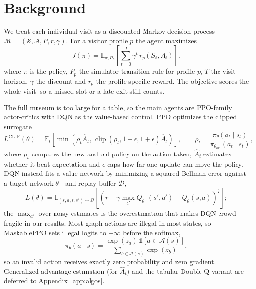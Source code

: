 \documentclass[11pt]{article}
\numberwithin{equation}{section} %
\newcommand{\E}{\mathbb{E}}
\newcommand{\Acal}{\mathcal{A}}
\newcommand{\ind}{\mathbb{1}}
\newcommand{\added}[1]{{\color{green!50!black}#1}}
\newenvironment{addedblock}{\begingroup\color{green!50!black}}{\endgroup}
\begin{document}
\added{\section{Background}}
\begin{addedblock}
We treat each individual visit as a discounted Markov decision process
$\mathcal{M}=(\mathcal{S},\mathcal{A},P,r,\gamma)$. For a visitor profile $p$ the agent maximizes
\begin{equation}
J(\pi)=\E_{\pi,P_p}\!\left[\sum_{t=0}^{T}\gamma^t\,r_p(S_t,A_t)\right],
\label{eq:objective}
\end{equation}
where $\pi$ is the policy, $P_p$ the simulator transition rule for profile $p$, $T$ the visit horizon,
$\gamma$ the discount and $r_p$ the profile-specific reward. The objective scores the whole visit, so a missed
slot or a late exit still counts.

The full museum is too large for a table, so the main agents are PPO-family actor-critics with DQN as the
value-based control. PPO \citep{schulman2017} optimizes the clipped surrogate
\begin{equation}
L^{\text{CLIP}}(\theta)=
\E_t\!\left[\min\!\left(\rho_t\hat A_t,\,
\operatorname{clip}(\rho_t,1-\epsilon,1+\epsilon)\hat A_t\right)\right],
\qquad
\rho_t=\frac{\pi_\theta(a_t\mid s_t)}{\pi_{\theta_{\text{old}}}(a_t\mid s_t)},
\label{eq:ppo}
\end{equation}
where $\rho_t$ compares the new and old policy on the action taken, $\hat A_t$ estimates whether it beat
expectation and $\epsilon$ caps how far one update can move the policy. DQN \citep{mnih2015} instead fits a
value network by minimizing a squared Bellman error against a target network $\theta^-$ and replay buffer
$\mathcal D$,
\begin{equation}
L(\theta)=\E_{(s,a,r,s')\sim\mathcal{D}}
\!\left[\left(r+\gamma\max_{a'}Q_{\theta^-}(s',a')-Q_\theta(s,a)\right)^2\right];
\label{eq:dqn}
\end{equation}
the $\max_{a'}$ over noisy estimates is the overestimation that makes DQN crowd-fragile in our results. Most
graph actions are illegal in most states, so MaskablePPO sets illegal logits to $-\infty$ before the softmax,
\begin{equation}
\pi_\theta(a\mid s)=
\frac{\exp(z_a)\,\ind[a\in\Acal(s)]}{\sum_{b\in\Acal(s)}\exp(z_b)},
\label{eq:mask}
\end{equation}
so an invalid action receives exactly zero probability and zero gradient. Generalized advantage estimation
(for $\hat A_t$) and the tabular Double-Q variant are deferred to Appendix~\ref{app:algos}.
\end{addedblock}
\end{document}
